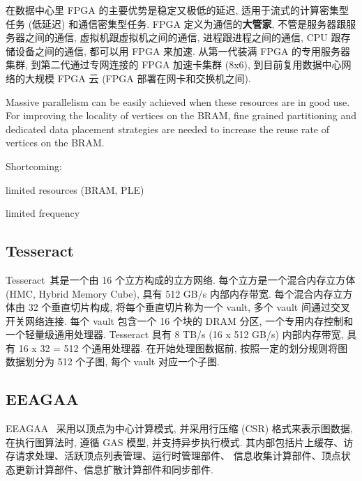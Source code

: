 \documentclass[UTF8,12pt,a4paper]{article}
\begin{document}
在数据中心里 FPGA 的主要优势是稳定又极低的延迟, 适用于流式的计算密集型任务 (低延迟) 和通信密集型任务.
FPGA 定义为通信的\textbf{大管家}, 不管是服务器跟服务器之间的通信, 虚拟机跟虚拟机之间的通信,
进程跟进程之间的通信, CPU 跟存储设备之间的通信, 都可以用 FPGA 来加速.
从第一代装满 FPGA 的专用服务器集群, 到第二代通过专网连接的 FPGA 加速卡集群 (8x6),
到目前复用数据中心网络的大规模 FPGA 云 (FPGA 部署在网卡和交换机之间).

Massive parallelism can be easily achieved when these resources are in good use.
For improving the locality of vertices on the BRAM,
fine grained partitioning and dedicated data placement strategies
are needed to increase the reuse rate of vertices on the BRAM.

Shortcoming:
\begin{compactitem}
  \item limited resources (BRAM, PLE)
  \item limited frequency
\end{compactitem}


\subsection{Tesseract}
Tesseract~\cite{DBLP:conf/isca/AhnHYMC15}其是一个由 16 个立方构成的立方网络.
每个立方是一个混合内存立方体(HMC, Hybrid Memory Cube), 具有 512 GB/s 内部内存带宽.
每个混合内存立方体由 32 个垂直切片构成, 将每个垂直切片称为一个 vault, 多个 vault 间通过交叉开关网络连接.
每个 vault 包含一个 16 个块的 DRAM 分区, 一个专用内存控制和一个轻量级通用处理器.
Tesseract 具有 8 TB/s (16 x 512 GB/s) 内部内存带宽, 具有 16 x 32 = 512 个通用处理器.
在开始处理图数据前, 按照一定的划分规则将图数据划分为 512 个子图, 每个 vault 对应一个子图.

\subsection{EEAGAA}
EEAGAA~\cite{DBLP:conf/isca/OzdalYKAGBO16} 采用以顶点为中心计算模式,
并采用行压缩 (CSR) 格式来表示图数据, 在执行图算法时, 遵循 GAS 模型, 并支持异步执行模式.
其内部包括片上缓存、访存请求处理、活跃顶点列表管理、运行时管理部件、
信息收集计算部件、顶点状态更新计算部件、信息扩散计算部件和同步部件.
\end{document}
